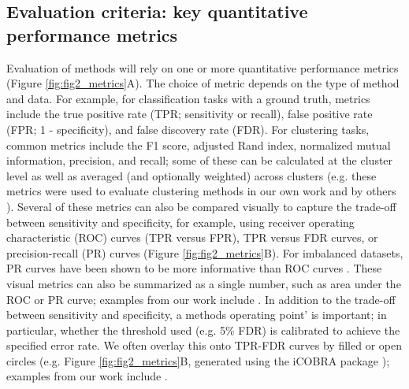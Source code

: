 \subsection{Evaluation criteria: key quantitative performance metrics}

Evaluation of methods will rely on one or more quantitative performance metrics (Figure  \ref{fig:fig2_metrics}A). The choice of metric depends on the type of method and data. For example, for classification tasks with a ground truth, metrics include the true positive rate (TPR; sensitivity or recall), false positive rate (FPR; 1 - specificity), and false discovery rate (FDR). For clustering tasks, common metrics include the F1 score, adjusted Rand index, normalized mutual information, precision, and recall; some of these can be calculated at the cluster level as well as averaged (and optionally weighted) across clusters (e.g. these metrics were used to evaluate clustering methods in our own work \cite{duo_systematicperformanceevaluation_2018,weber_comparisonclusteringmethods_2016}  and by others \cite{freytag_comparisonclusteringtools_2018,aghaeepour_criticalassessmentautomated_2013,wiwie_comparingperformancebiomedical_2015}). Several of these metrics can also be compared visually to capture the trade-off between sensitivity and specificity, for example, using receiver operating characteristic (ROC) curves (TPR versus FPR), TPR versus FDR curves, or precision-recall (PR) curves (Figure \ref{fig:fig2_metrics}B). For imbalanced datasets, PR curves have been shown to be more informative than ROC curves \cite{saito_precisionrecallplotmore_2015,powers_visualizationtradeoffevaluation_2015}. These visual metrics can also be summarized as a single number, such as area under the ROC or PR curve; examples from our work include \cite{weber_diffcytdifferentialdiscovery_2019,soneson_biasrobustnessscalability_2018}. In addition to the trade-off between sensitivity and specificity, a methods operating point' is important; in particular, whether the threshold used (e.g. 5\% FDR) is calibrated to achieve the specified error rate. We often overlay this onto TPR-FDR curves by filled or open circles (e.g. Figure \ref{fig:fig2_metrics}B, generated using the iCOBRA package \cite{soneson_icobraopenreproducible_2016}); examples from our work include \cite{weber_diffcytdifferentialdiscovery_2019,nowicka_drimseqdirichletmultinomialframework_2016,zhou_robustlydetectingdifferential_2014,soneson_differentialanalysesrnaseq_2016}.

